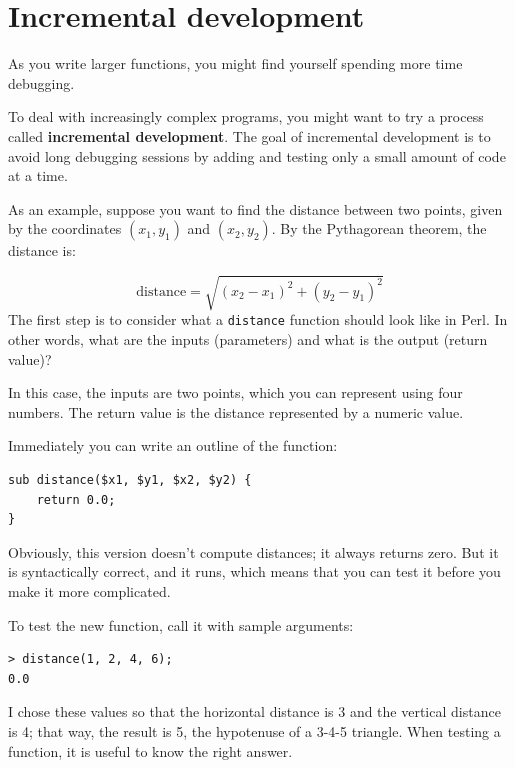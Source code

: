 \section{Incremental development}
\label{incremental.development}

As you write larger functions, you might find yourself
spending more time debugging.

To deal with increasingly complex programs,
you might want to try a process called
{\bf incremental development}.  The goal of incremental development
is to avoid long debugging sessions by adding and testing only
a small amount of code at a time.

As an example, suppose you want to find the distance between two
points, given by the coordinates $(x_1, y_1)$ and $(x_2, y_2)$.
By the Pythagorean theorem, the distance is:

\begin{displaymath}
\mathrm{distance} = \sqrt{(x_2 - x_1)^2 + (y_2 - y_1)^2}
\end{displaymath}
%
The first step is to consider what a {\tt distance} function should
look like in Perl.  In other words, what are the inputs (parameters)
and what is the output (return value)?

In this case, the inputs are two points, which you can represent
using four numbers.  The return value is the distance represented by
a numeric value.

Immediately you can write an outline of the function:

\begin{verbatim}
sub distance($x1, $y1, $x2, $y2) {
    return 0.0;
}
\end{verbatim}
%
Obviously, this version doesn't compute distances; it always returns
zero.  But it is syntactically correct, and it runs, which means that
you can test it before you make it more complicated.

To test the new function, call it with sample arguments:

\begin{verbatim}
> distance(1, 2, 4, 6);
0.0
\end{verbatim}
%
I chose these values so that the horizontal distance is 3 and the
vertical distance is 4; that way, the result is 5, the hypotenuse 
of a 3-4-5 triangle. When testing a function, it is
useful to know the right answer.

